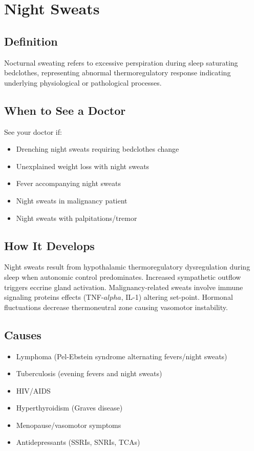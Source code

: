 \chapter{Night Sweats}

\section*{Definition}
Nocturnal sweating refers to excessive perspiration during sleep saturating bedclothes, representing abnormal thermoregulatory response indicating underlying physiological or pathological processes.

\section*{When to See a Doctor}
See your doctor if:
\begin{itemize}
  \item Drenching night sweats requiring bedclothes change
  \item Unexplained weight loss with night sweats
  \item Fever accompanying night sweats
  \item Night sweats in malignancy patient
  \item Night sweats with palpitations/tremor
\end{itemize}

\section*{How It Develops}
Night sweats result from hypothalamic thermoregulatory dysregulation during sleep when autonomic control predominates. Increased sympathetic outflow triggers eccrine gland activation. Malignancy-related sweats involve immune signaling proteins effects (TNF-$alpha$, IL-1) altering set-point. Hormonal fluctuations decrease thermoneutral zone causing vasomotor instability.

\section*{Causes}
\begin{itemize}
  \item Lymphoma (Pel-Ebstein syndrome alternating fevers/night sweats)
  \item Tuberculosis (evening fevers and night sweats)
  \item HIV/AIDS
  \item Hyperthyroidism (Graves disease)
  \item Menopause/vasomotor symptoms
  \item Antidepressants (SSRIs, SNRIs, TCAs)
\end{itemize}

